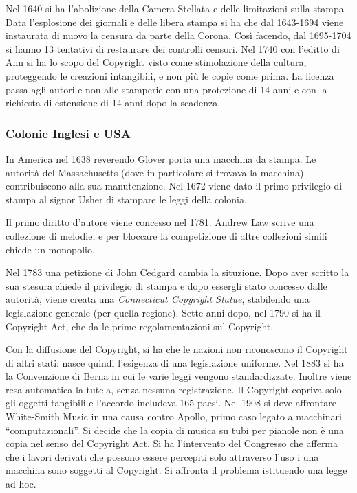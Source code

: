 Nel 1640 si ha l'abolizione della Camera Stellata e delle limitazioni sulla stampa. Data l'esplosione dei giornali e delle libera stampa si ha che dal 1643-1694 viene instaurata di nuovo la censura da parte della Corona. Cos\`i facendo, dal 1695-1704 si hanno 13 tentativi di restaurare dei controlli censori. Nel 1740 con l'editto di Ann si ha lo scopo del Copyright visto come stimolazione della cultura, proteggendo le creazioni intangibili, e non pi\`u le copie come prima.
La licenza passa agli autori e non alle stamperie con una protezione di 14 anni e con la richiesta di estensione di 14 anni dopo la scadenza.

\subsubsection{Colonie Inglesi e USA}

In America nel 1638 reverendo Glover porta una macchina da stampa. Le autorit\`a del Massachusetts (dove in particolare si trovava la macchina) contribuiscono alla sua manutenzione. Nel 1672 viene dato il primo privilegio di stampa al signor Usher di stampare le leggi della colonia.

Il primo diritto d'autore viene concesso nel 1781: Andrew Law scrive una collezione di melodie, e per bloccare la competizione di altre collezioni simili chiede un monopolio.

Nel 1783 una petizione di John Cedgard cambia la situzione. Dopo aver scritto la sua stesura chiede il privilegio di stampa e dopo essergli stato concesso dalle autorit\`a, viene creata una \textit{Connecticut Copyright Statue}, stabilendo una legislazione generale (per quella regione). Sette anni dopo, nel 1790 si ha il Copyright Act, che da le prime regolamentazioni sul Copyright.

Con la diffusione del Copyright, si ha che le nazioni non riconoscono il Copyright di altri stati: nasce quindi l'esigenza di una legislazione uniforme. Nel 1883 si ha la Convenzione di Berna in cui le varie leggi vengono standardizzate. Inoltre viene resa automatica la tutela, senza nessuna registrazione. Il Copyright copriva solo gli oggetti tangibili e l'accordo includeva 165 paesi. Nel 1908 si deve affrontare White-Smith Music in una causa contro Apollo, primo caso legato a macchinari ``computazionali''. Si decide che la copia di musica su tubi per pianole non \`e una copia nel senso del Copyright Act. Si ha l'intervento del Congresso che afferma che i lavori derivati che possono essere percepiti solo attraverso l'uso i una macchina sono soggetti al Copyright. Si affronta il problema istituendo una legge ad hoc.

